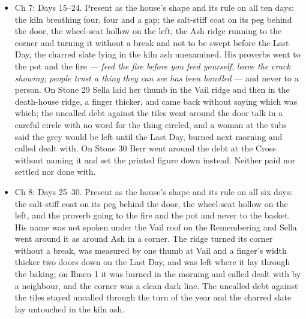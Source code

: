\documentclass{design/chronicle}
\begin{document}
{\begin{itemize}[leftmargin=1.4em,itemsep=1pt,topsep=3pt,parsep=0pt]
\item Ch 7: Days 15--24. Present as the house’s shape and its rule on all ten days: the kiln breathing four, four and a gap; the salt-stiff coat on its peg behind the door, the wheel-seat hollow on the left, the Ash ridge running to the corner and turning it without a break and not to be swept before the Last Day, the charred slate lying in the kiln ash unexamined. His proverbs went to the pot and the fire --- \emph{feed the fire before you feed yourself}, \emph{leave the crack showing; people trust a thing they can see has been handled} --- and never to a person. On Stone 29 Sella laid her thumb in the Vail ridge and then in the death-house ridge, a finger thicker, and came back without saying which was which; the uncalled debt against the tiles went around the door talk in a careful circle with no word for the thing circled, and a woman at the tubs said the grey would be left until the Last Day, burned next morning and called dealt with. On Stone 30 Berr went around the debt at the Cross without naming it and set the printed figure down instead. Neither paid nor settled nor done with.

\end{itemize}

\begin{itemize}[leftmargin=1.4em,itemsep=1pt,topsep=3pt,parsep=0pt]

\item Ch 8: Days 25--30. Present as the house’s shape and its rule on all six days: the salt-stiff coat on its peg behind the door, the wheel-seat hollow on the left, and the proverb going to the fire and the pot and never to the basket. His name was not spoken under the Vail roof on the Remembering and Sella went around it as around Ash in a corner. The ridge turned its corner without a break, was measured by one thumb at Vail and a finger’s width thicker two doors down on the Last Day, and was left where it lay through the baking; on Ilmen 1 it was burned in the morning and called dealt with by a neighbour, and the corner was a clean dark line. The uncalled debt against the tiles stayed uncalled through the turn of the year and the charred slate lay untouched in the kiln ash.

\end{itemize}

\begin{itemize}[leftmargin=1.4em,itemsep=1pt,topsep=3pt,parsep=0pt]


\end{itemize}}
\end{document}
